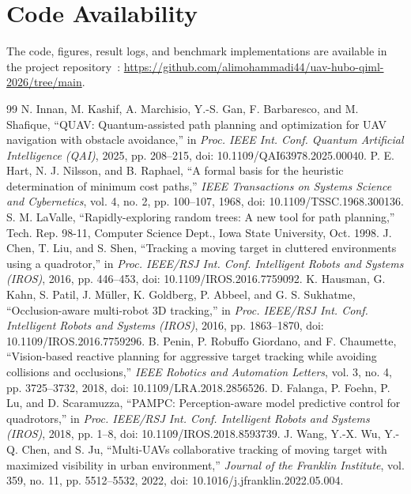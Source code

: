 \documentclass[10pt,conference]{IEEEtran}
\begin{document}
\section*{Code Availability}
The code, figures, result logs, and benchmark implementations are available in the project repository~\cite{mohammadiGithub}: \url{https://github.com/alimohammadi44/uav-hubo-qiml-2026/tree/main}.

\begin{thebibliography}{99}
 N. Innan, M. Kashif, A. Marchisio, Y.-S. Gan, F. Barbaresco, and M. Shafique, ``QUAV: Quantum-assisted path planning and optimization for UAV navigation with obstacle avoidance,'' in \emph{Proc. IEEE Int. Conf. Quantum Artificial Intelligence (QAI)}, 2025, pp. 208--215, doi: 10.1109/QAI63978.2025.00040.
 P. E. Hart, N. J. Nilsson, and B. Raphael, ``A formal basis for the heuristic determination of minimum cost paths,'' \emph{IEEE Transactions on Systems Science and Cybernetics}, vol. 4, no. 2, pp. 100--107, 1968, doi: 10.1109/TSSC.1968.300136.
 S. M. LaValle, ``Rapidly-exploring random trees: A new tool for path planning,'' Tech. Rep. 98-11, Computer Science Dept., Iowa State University, Oct. 1998.
 J. Chen, T. Liu, and S. Shen, ``Tracking a moving target in cluttered environments using a quadrotor,'' in \emph{Proc. IEEE/RSJ Int. Conf. Intelligent Robots and Systems (IROS)}, 2016, pp. 446--453, doi: 10.1109/IROS.2016.7759092.
 K. Hausman, G. Kahn, S. Patil, J. M\"uller, K. Goldberg, P. Abbeel, and G. S. Sukhatme, ``Occlusion-aware multi-robot 3D tracking,'' in \emph{Proc. IEEE/RSJ Int. Conf. Intelligent Robots and Systems (IROS)}, 2016, pp. 1863--1870, doi: 10.1109/IROS.2016.7759296.
 B. Penin, P. Robuffo Giordano, and F. Chaumette, ``Vision-based reactive planning for aggressive target tracking while avoiding collisions and occlusions,'' \emph{IEEE Robotics and Automation Letters}, vol. 3, no. 4, pp. 3725--3732, 2018, doi: 10.1109/LRA.2018.2856526.
 D. Falanga, P. Foehn, P. Lu, and D. Scaramuzza, ``PAMPC: Perception-aware model predictive control for quadrotors,'' in \emph{Proc. IEEE/RSJ Int. Conf. Intelligent Robots and Systems (IROS)}, 2018, pp. 1--8, doi: 10.1109/IROS.2018.8593739.
 J. Wang, Y.-X. Wu, Y.-Q. Chen, and S. Ju, ``Multi-UAVs collaborative tracking of moving target with maximized visibility in urban environment,'' \emph{Journal of the Franklin Institute}, vol. 359, no. 11, pp. 5512--5532, 2022, doi: 10.1016/j.jfranklin.2022.05.004.

\end{thebibliography}
\end{document}
